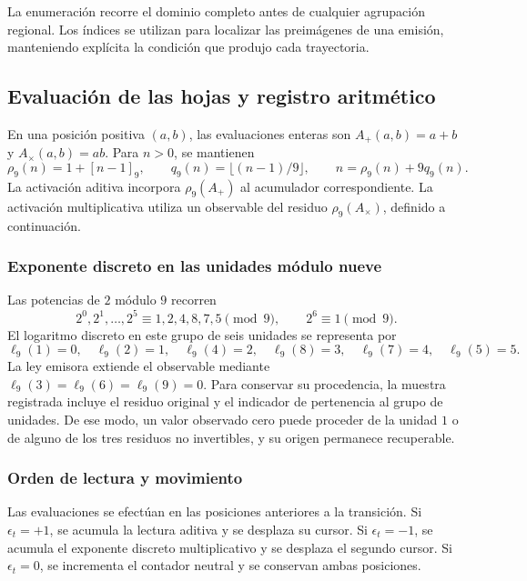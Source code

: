 La enumeración recorre el dominio completo antes de cualquier agrupación
regional. Los índices se utilizan para localizar las preimágenes de una
emisión, manteniendo explícita la condición que produjo cada trayectoria.

\subsection{Evaluación de las hojas y registro aritmético}
\label{tpk:lecturas}

En una posición positiva \((a,b)\), las evaluaciones enteras son
\(A_+(a,b)=a+b\) y \(A_\times(a,b)=ab\). Para \(n>0\), se mantienen
\begin{equation}
 \rho_9(n)=1+[n-1]_9,\qquad
 q_9(n)=\lfloor(n-1)/9\rfloor,\qquad
 n=\rho_9(n)+9q_9(n).
 \label{tpk:division-evaluacion}
\end{equation}
La activación aditiva incorpora \(\rho_9(A_+)\) al acumulador
correspondiente. La activación multiplicativa utiliza un observable del
residuo \(\rho_9(A_\times)\), definido a continuación.

\subsubsection{Exponente discreto en las unidades módulo nueve}

Las potencias de \(2\) módulo \(9\) recorren
\[
 2^0,2^1,\ldots,2^5\equiv1,2,4,8,7,5\pmod9,
 \qquad 2^6\equiv1\pmod9.
\]
El logaritmo discreto en este grupo de seis unidades se representa por
\begin{equation}
 \ell_9(1)=0,\quad\ell_9(2)=1,\quad\ell_9(4)=2,
 \quad\ell_9(8)=3,\quad\ell_9(7)=4,\quad\ell_9(5)=5.
 \label{tpk:logaritmo}
\end{equation}
La ley emisora extiende el observable mediante
\(\ell_9(3)=\ell_9(6)=\ell_9(9)=0\). Para conservar su procedencia, la
muestra registrada incluye el residuo original y el indicador de pertenencia
al grupo de unidades. De ese modo, un valor observado cero puede proceder
de la unidad \(1\) o de alguno de los tres residuos no invertibles, y su
origen permanece recuperable.

\subsubsection{Orden de lectura y movimiento}

Las evaluaciones se efectúan en las posiciones anteriores a la transición.
Si \(\epsilon_t=+1\), se acumula la lectura aditiva y se desplaza su cursor.
Si \(\epsilon_t=-1\), se acumula el exponente discreto multiplicativo y se
desplaza el segundo cursor. Si \(\epsilon_t=0\), se incrementa el contador
neutral y se conservan ambas posiciones.

